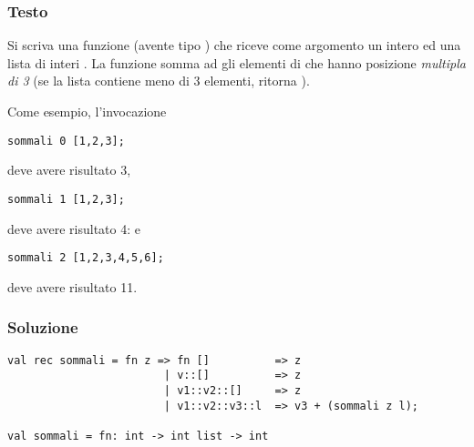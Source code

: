 \subsubsection{Testo}

Si scriva una funzione  (avente tipo ) che riceve come argomento un intero  ed una lista di interi .
La funzione  somma ad  gli elementi di  che hanno posizione \emph{multipla di 3} (se la lista contiene meno di 3 elementi,  ritorna ).

\medskip
Come esempio, l'invocazione

\begin{lstlisting}
sommali 0 [1,2,3];
\end{lstlisting}

deve avere risultato 3,

\begin{lstlisting}
sommali 1 [1,2,3];
\end{lstlisting}

deve avere risultato 4: e

\begin{lstlisting}
sommali 2 [1,2,3,4,5,6];
\end{lstlisting}

deve avere risultato 11.

\subsubsection{Soluzione}

\begin{lstlisting}[style = SML, caption = {[Definizione della funzione \sml{sommali} - 2\textsuperscript{o} Turno]Definizione della funzione \sml{sommali}}]
val rec sommali = fn z => fn []          => z
						| v::[]          => z
						| v1::v2::[]     => z
						| v1::v2::v3::l  => v3 + (sommali z l);

val sommali = fn: int -> int list -> int
\end{lstlisting}
